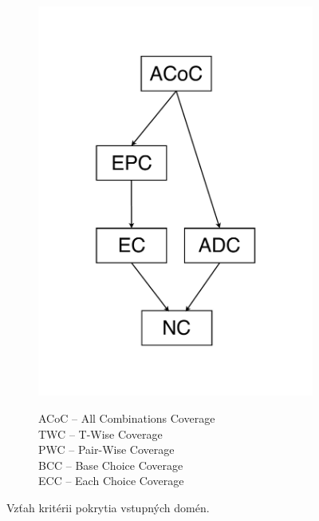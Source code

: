 \begin{figure}[H]
	\centering
	\begin{subfigure}{0.4\linewidth}
		\centering
		\includegraphics[width=\linewidth]{obrazky/vztah_kriterii_domen.pdf}
	\end{subfigure}
	\quad
	\begin{subfigure}{0.4\linewidth}
		\centering
		\begin{flushleft}
			\large
			ACoC -- All Combinations Coverage \\
			\medskip
			TWC -- T-Wise Coverage \\
			\medskip
			PWC -- Pair-Wise Coverage \\
			\medskip
			BCC -- Base Choice Coverage \\
			\medskip
			ECC -- Each Choice Coverage \\
		\end{flushleft}
	\end{subfigure}
	\caption{Vzťah kritérii pokrytia vstupných domén.}
\end{figure}

